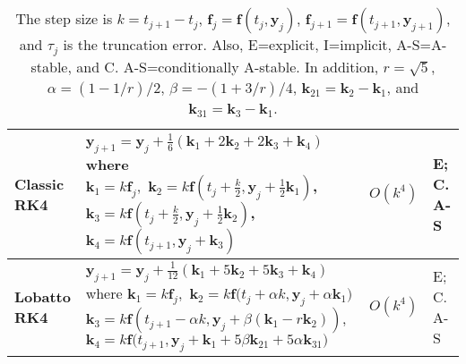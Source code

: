 \documentclass[11pt]{article}
\begin{document}
\begin{table}[H]
\begin{tabular}{|p{0.9in}|p{2.7in}|p{0.4in}|p{0.9in}|}
\textbf{Classic RK4} 
&${\displaystyle \mathbf{y}_{j+1}=\mathbf{y}_{j}+\frac{1}{6}(\mathbf{k}_{1}+2\mathbf{k}_{2}+2\mathbf{k}_{3}+\mathbf{k}_{4})}$   \vspace{0.5pt}   \newline where   \vspace{2pt} \newline 
${\displaystyle \mathbf{k}_{1}=k\mathbf{f}_{j}}, \,\,  \mathbf{k}_{2}=k\mathbf{f}(t_{j}+\frac{k}{2},\mathbf{y}_{j}+\frac{1}{2}\mathbf{k}_{1})$, \vspace{2pt} \newline
${\displaystyle \mathbf{k}_{3}=k\mathbf{f}(t_{j}+\frac{k}{2},\mathbf{y}_{j}+\frac{1}{2}\mathbf{k}_{2})}$,  \vspace{2pt} \newline ${\displaystyle \mathbf{k}_{4}=k\mathbf{f}(t_{j+1},\mathbf{y}_{j}+\mathbf{k}_{3})}$ & $O(k^{4})$ 
 & E;  C. A-S\\ \hline

\textbf{Lobatto RK4}&${\displaystyle \mathbf{y}_{j+1}=\mathbf{y}_{j}+\frac{1}{12}(\mathbf{k}_{1}+5\mathbf{k}_{2}+5\mathbf{k}_{3}+\mathbf{k}_{4})}$   \vspace{0.5pt}   \newline where   \vspace{2pt} \newline 
${\displaystyle \mathbf{k}_{1}=k\mathbf{f}_{j}}, \,\, \mathbf{k}_{2}=k\mathbf{f} \Big (t_{j}+\alpha k,\mathbf{y}_{j}+\alpha \mathbf{k}_1 \Big )$  \vspace{2pt}  \newline
${\displaystyle \mathbf{k}_{3}=k\mathbf{f}(t_{j+1}-\alpha k,\mathbf{y}_{j}+\beta(\mathbf{k}_1-r\mathbf{k}_{2}))}$,  \vspace{3pt} \newline ${\displaystyle \mathbf{k}_{4}=k\mathbf{f}(t_{j+1},\mathbf{y}_{j}+\mathbf{k}_1}+5\beta \mathbf{k}_{21} + 5\alpha \mathbf{k}_{31})$ & $O(k^{4})$ 
& E;  C. A-S\\ \hline

\end{tabular}
\caption{The  step size is $k=t_{j+1}-t_{j}$, $\mathbf{f}_{j}=\mathbf{f}(t_{j},\mathbf{y}_{j})$, $\mathbf{f}_{j+1}=\mathbf{f}(t_{j+1},\mathbf{y}_{j+1})$, and $\tau_j$ is the truncation error. Also, E=explicit, I=implicit, A-S=A-stable, and C. A-S=conditionally A-stable.  In addition, $r=\sqrt{5}$, $\alpha= (1-  1/r )/2 $,  $\beta=  - (1+3/r)/4$, $\mathbf{k}_{21}=\mathbf{k}_2-\mathbf{k}_1$, and $\mathbf{k}_{31}=\mathbf{k}_3-\mathbf{k}_1$.}
\end{table}
\end{document}
